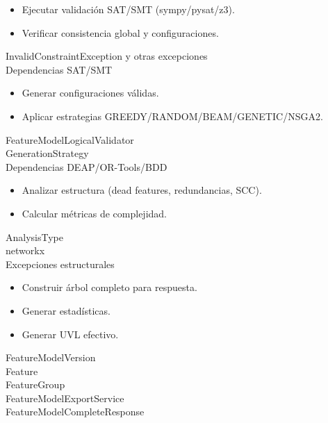 \begin{addendum}
		\begin{crccard}
			\crcresp
			{
				\begin{itemize}
				\item Ejecutar validación \ac{SAT}/\ac{SMT} (sympy/pysat/z3).
				\item Verificar consistencia global y configuraciones.
				\end{itemize}
			}
			\crccolab
			{
				InvalidConstraintException y otras excepciones\\
				Dependencias \ac{SAT}/\ac{SMT}
			}
		\end{crccard}

		\begin{crccard}
			\crcresp
			{
				\begin{itemize}
				\item Generar configuraciones válidas.
				\item Aplicar estrategias GREEDY/RANDOM/BEAM/GENETIC/NSGA2.
				\end{itemize}
			}
			\crccolab
			{
				FeatureModelLogicalValidator\\
				GenerationStrategy\\
				Dependencias DEAP/OR-Tools/BDD
			}
		\end{crccard}

		\begin{crccard}
			\crcresp
			{
				\begin{itemize}
				\item Analizar estructura (dead features, redundancias, SCC).
				\item Calcular métricas de complejidad.
				\end{itemize}
			}
			\crccolab
			{
				AnalysisType\\
				networkx\\
				Excepciones estructurales
			}
		\end{crccard}

		\begin{crccard}
			\crcresp
			{
				\begin{itemize}
				\item Construir árbol completo para respuesta.
				\item Generar estadísticas.
				\item Generar \ac{UVL} efectivo.
				\end{itemize}
			}
			\crccolab
			{
				FeatureModelVersion\\
				Feature\\
				FeatureGroup\\
				FeatureModelExportService\\
				FeatureModelCompleteResponse
			}
		\end{crccard}


\end{addendum}
